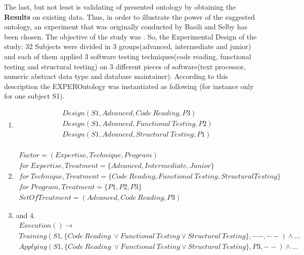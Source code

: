 	The last, but not least is validating of presented ontology by obtaining the \textbf{Results} on existing data. Thus, in order to illustrate the power of the suggested ontology, an experiment that was originally conducted by Basili and Selby\cite{Bas87} has been chosen. The objective of the study was \frqq\cite[abstract]{Bas87}. So, the Experimental Design of the study: 32 Subjects were divided in 3 groups(advanced, intermediate and junior) and  each of them applied 3 software testing techniques(code reading, functional testing and structural testing) on 3 different pieces of software(text processor, numeric abstract data type and database maintainer). According to this description the EXPEROntology was instantiated as following (for instance only for one subject S1).
	\begin{enumerate}
		\item \begin{align*}
			Design(S1, Advanced, Code\ Reading, P3) \\
			Design(S1, Advanced, Functional\ Testing, P2) \\
			Design(S1, Advanced, Structural\ Testing, P1) \\
		\end{align*}
		\item \begin{align*}
			Factor = (Expertise, Technique, Program) \\
			for\ Expertise, Treatment = \{Advanced, Intermediate, Junior\} \\
			for\ Technique, Treatment = \{Code\ Reading, Functional\ Testing, Structural Testing\} \\
			for\ Program, Treatment = \{P1,P2,P3\} \\
			SetOfTreatment = {(Advanced, Code\ Reading, P3)}
		\end{align*}
		\item and 4.  
		\begin{align*}
			Execution() \rightarrow  \\
			Training(S1, \{Code\ Reading\ \lor Functional\ Testing \lor  Structural\ Testing\}, --, --) \land ... \\
			Applying(S1,\{Code\ Reading\ \lor Functional\ Testing \lor  Structural\ Testing\}, P3, --) \land ... \\
		\end{align*}
	\end{enumerate}
  
